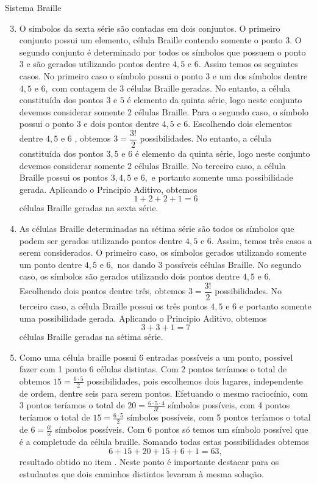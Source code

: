 \begin{answer}{Sistema Braille}
{
\begin{enumerate}
\setcounter{enumi}{2}

\item O símbolos da sexta série  são contadas em dois conjuntos. O primeiro conjunto possui um elemento, célula Braille contendo somente o ponto $3.$ O segundo conjunto é determinado por todos os símbolos que possuem o ponto $3$ e são gerados utilizando pontos dentre $4, 5$ e $6.$
Assim temos os seguintes casos. No primeiro caso o símbolo possui o ponto $3$ e um dos símbolos dentre $4{,}5$ e $6,$ com contagem de $3$ células Braille geradas. No entanto, a célula constituída dos pontos $3$ e $5$ é elemento da quinta série, logo neste conjunto devemos considerar somente $2$ células Braille.  Para o segundo caso, o símbolo possui o ponto $3$ e dois pontos dentre $4,5$ e $6.$ Escolhendo dois elementos dentre $4,5$ e $6$  , obtemos $3=\dfrac{3!}{2}$ possibilidades. No entanto, a célula constituída dos pontos $3,5$ e $6$ é elemento da quinta série, logo neste conjunto devemos considerar somente $2$ células Braille.  No terceiro caso, a célula Braille possui os pontos $3,4,5$ e $6,$ e portanto somente uma possibilidade gerada. Aplicando o Principio Aditivo, obtemos  
$$1+2+2+1 =6$$ 
células Braille geradas na sexta série.

\item As células Braille determinadas na sétima série são todos os símbolos que podem ser gerados utilizando pontos dentre $4,5$ e $6.$ Assim, temos três casos a serem considerados. O primeiro caso, os símbolos gerados utilizando somente um ponto dentre  $4,5$ e $6,$ nos dando 3 possíveis células Braille. No segundo caso, os símbolos são gerados utilizando dois pontos dentre $4,5$ e $6.$ Escolhendo dois pontos dentre três, obtemos $3=\dfrac{3!}{2}$ possibilidades. No terceiro caso, a célula Braille possui os três pontos  $4,5$ e $6$ e portanto somente uma possibilidade gerada. Aplicando o Principio Aditivo, obtemos  
$$3+3+1 =7$$ 
células Braille geradas na sétima série.

\item Como uma célula braille possui 6 entradas possíveis a um ponto,  possível fazer com 1 ponto 6 células distintas. Com 2 pontos teríamos o total de  obtemos $15=\frac{6 \cdot 5}{2}$ possibilidades, pois escolhemos dois lugares, independente de ordem, dentre seis para serem pontos. Efetuando o mesmo raciocínio, com 3 pontos teríamos o total de $20= \frac{6 \cdot 5 \cdot 4}{3!}$ símbolos possíveis,  com 4 pontos teríamos o total de $15=\frac{6 \cdot 5}{2}$ símbolos possíveis,  com 5 pontos teríamos o total de $6=\frac{6!}{5!}$ símbolos possíveis. Com 6 pontos só temos um símbolo possível que é a completude da célula braille. Somando todas estas possibilidades obtemos 
$$6+15+20+15+6+1=63,$$
resultado obtido no item . Neste ponto é importante destacar para os estudantes que dois caminhos distintos levaram à mesma solução. 


\end{enumerate}}
\end{answer}
